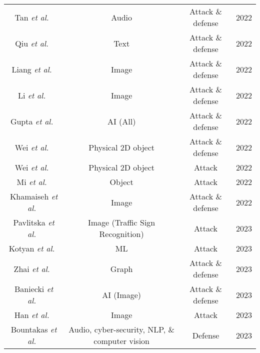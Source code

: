 \documentclass{ieeeaccess}
\def\etal{\textit{et al.}}
\begin{document}
\begin{table*}
\begin{center}
\begin{tabular}{ c  c  c  c }
    Tan \etal~\cite{tan2022adversarial} & Audio & Attack \& defense & 2022 \\
    
    Qiu \etal~\cite{qiu2022adversarial} & Text & Attack \& defense & 2022 \\
    
    Liang \etal~\cite{liang2022adversarial} & Image & Attack \& defense & 2022 \\
    
    Li \etal~\cite{li2022review} & Image & Attack \& defense & 2022\\
    
    Gupta \etal~\cite{gupta2022adversarial} & AI (All) & Attack \& defense & 2022 \\
    
    
    Wei \etal~\cite{wei2022physically} & Physical 2D object & Attack \& defense & 2022 \\
    
      Wei \etal~\cite{wei2022physical} & Physical 2D object & Attack & 2022 \\
    
    Mi \etal~\cite{mi2022adversarial} & Object & Attack & 2022 \\

    
    Khamaiseh \etal~\cite{khamaiseh2022adversarial} & Image & Attack \& defense & 2022 \\


    Pavlitska \etal~\cite{pavlitska2023adversarial} & Image (Traffic Sign Recognition) & Attack & 2023 \\


    Kotyan \etal~\cite{kotyan2023reading} & ML & Attack & 2023 \\


    Zhai \etal~\cite{zhai2023state} & Graph & Attack \& defense & 2023 \\


   Baniecki \etal~\cite{baniecki2023adversarial} & AI (Image) & Attack \& defense & 2023 \\

    Han \etal~\cite{han2023interpreting} & Image & Attack & 2023 \\

    Bountakas \etal~\cite{bountakas2023defense} & Audio, cyber-security, NLP, \& computer vision & Defense & 2023 \\



    
    \bottomrule
    \end{tabular}

\end{center}
\end{table*}
\end{document}
